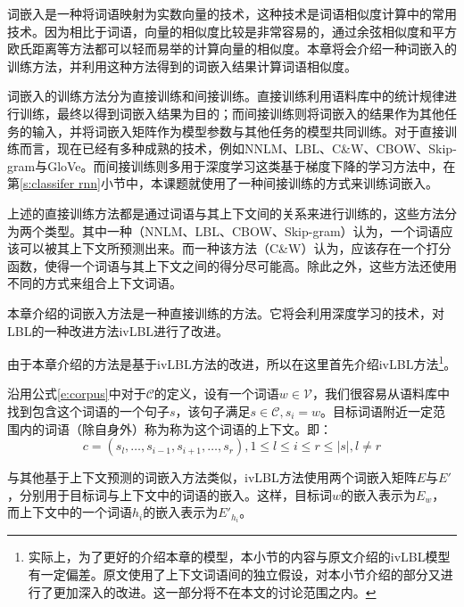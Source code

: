 
词嵌入是一种将词语映射为实数向量的技术，这种技术是词语相似度计算中的常用技术。因为相比于词语，向量的相似度比较是非常容易的，通过余弦相似度和平方欧氏距离等方法都可以轻而易举的计算向量的相似度。本章将会介绍一种词嵌入的训练方法，并利用这种方法得到的词嵌入结果计算词语相似度。

词嵌入的训练方法分为直接训练和间接训练。直接训练利用语料库中的统计规律进行训练，最终以得到词嵌入结果为目的；而间接训练则将词嵌入的结果作为其他任务的输入，并将词嵌入矩阵作为模型参数与其他任务的模型共同训练。对于直接训练而言，现在已经有多种成熟的技术，例如NNLM、LBL、C\&W、CBOW、Skip-gram与GloVe。而间接训练则多用于深度学习这类基于梯度下降的学习方法中，在第\ref{s:classifer rnn}小节中，本课题就使用了一种间接训练的方式来训练词嵌入。

上述的直接训练方法都是通过词语与其上下文间的关系来进行训练的，这些方法分为两个类型。其中一种（NNLM、LBL、CBOW、Skip-gram）认为，一个词语应该可以被其上下文所预测出来。而一种该方法（C\&W）认为，应该存在一个打分函数，使得一个词语与其上下文之间的得分尽可能高。除此之外，这些方法还使用不同的方式来组合上下文词语。

本章介绍的词嵌入方法是一种直接训练的方法。它将会利用深度学习的技术，对LBL的一种改进方法ivLBL进行了改进。

\label{s:ivlbl}
由于本章介绍的方法是基于ivLBL方法的改进，所以在这里首先介绍ivLBL方法\footnote{实际上，为了更好的介绍本章的模型，本小节的内容与原文介绍的ivLBL模型有一定偏差。原文使用了上下文词语间的独立假设，对本小节介绍的部分又进行了更加深入的改进。这一部分将不在本文的讨论范围之内。}。

沿用公式\ref{e:corpus}中对于$\mathcal{C}$的定义，设有一个词语$w \in \mathcal{V}$，我们很容易从语料库中找到包含这个词语的一个句子$s$，该句子满足$s \in \mathcal{C}, s_i = w$。目标词语附近一定范围内的词语（除自身外）称为称为这个词语的上下文。即：
\begin{equation}
c = (s_l, \dots, s_{i - 1}, s_{i + 1}, \dots, s_r), 1 \leq l \leq i \leq r \leq |s|, l \neq r
\end{equation}

与其他基于上下文预测的词嵌入方法类似，ivLBL方法使用两个词嵌入矩阵$E$与$E'$，分别用于目标词与上下文中的词语的嵌入。这样，目标词$w$的嵌入表示为$E_w$，而上下文中的一个词语$h_i$的嵌入表示为$E'_{h_i}$。

